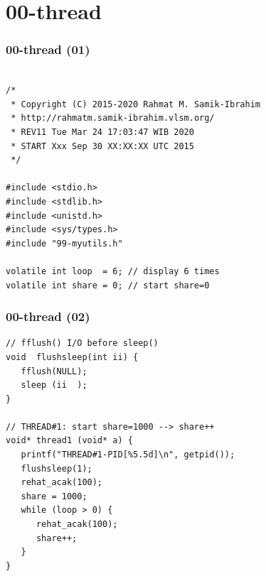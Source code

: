 \documentclass[xcolor=table, notheorems, hyperref={pdfpagelabels=false}]{beamer}
\begin{document}
\section{00-thread}
\begin{frame}[fragile]
\frametitle{00-thread (01)}
\begin{lstlisting}[basicstyle=\ttfamily\small]        %  65
% \begin{lstlisting}[basicstyle=\ttfamily\large]        %  54

/*
 * Copyright (C) 2015-2020 Rahmat M. Samik-Ibrahim
 * http://rahmatm.samik-ibrahim.vlsm.org/
 * REV11 Tue Mar 24 17:03:47 WIB 2020
 * START Xxx Sep 30 XX:XX:XX UTC 2015
 */

#include <stdio.h>
#include <stdlib.h>
#include <unistd.h>
#include <sys/types.h>
#include "99-myutils.h"

volatile int loop  = 6; // display 6 times
volatile int share = 0; // start share=0

\end{lstlisting}
\end{frame}

\begin{frame}[fragile]
\frametitle{00-thread (02)}
\begin{lstlisting}[basicstyle=\ttfamily\large]        %  54
// fflush() I/O before sleep() 
void  flushsleep(int ii) {
   fflush(NULL);
   sleep (ii  );
}

// THREAD#1: start share=1000 --> share++
void* thread1 (void* a) {
   printf("THREAD#1-PID[%5.5d]\n", getpid());
   flushsleep(1);
   rehat_acak(100);
   share = 1000;
   while (loop > 0) {
      rehat_acak(100);
      share++;
   }
}

\end{lstlisting}
\end{frame}
\end{document}
